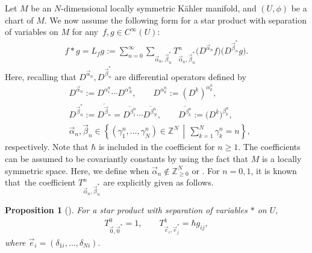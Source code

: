 \documentclass[pdftex]{sigma}
\numberwithin{equation}{section}
\newtheorem{Proposition}[Theorem]{Proposition}
 { \theoremstyle{definition}
\newtheorem{Definition}[Theorem]{Definition}
\newtheorem{Note}[Theorem]{Note}
\newtheorem{Example}[Theorem]{Example}
\newtheorem{Remark}[Theorem]{Remark} }
\begin{document}
Let $M$ be an $N$-dimensional locally symmetric K\"ahler manifold, and $(U,\phi)$ be a chart of $M$. We now assume the following form for a star product with separation of variables on $M$ for any~${ f,g \in C^{\infty} ( U )}$:
\begin{align}
 f\ast g
 =
 L_{f}g
 :=
 \sum_{n=0}^{\infty}
 \sum_{
 \vec{\alpha}_{n},
 \vec{\beta}_{n}^{\ast}
 }
 T_{\vec{\alpha}_{n},\vec{\beta}_{n}^{\ast}}^{n}
 \bigl(
 D^{\vec{\alpha}_{n}}f
 \bigr)
 \bigl(
 D^{\vec{\beta}_{n}^{\ast}}g
 \bigr).
 \label{star_expand}
\end{align}
Here, recalling that
$
 D^{\vec{\alpha}_{n}},
 D^{\vec{\beta}_{n}^{\ast}}
$
are differential operators defined by
\begin{align*}
 &
 D^{\vec{\alpha}_{n}}
 :=
 D^{\alpha_{1}^{n}}\cdots D^{\alpha_{N}^{n}},
 \qquad
 D^{\alpha_{k}^{n}}
 :=
 (
 D^{k}
 )^{\alpha_{k}^{n}},
 \\
 &
 D^{\vec{\beta}_{n}^{\ast}}
 :=
 \overline{
 D^{\vec{\beta}_{n}}
 }
 =
 \overline{D^{\beta_{1}^{n}}}
 \cdots
 \overline{D^{\beta_{N}^{n}}},
 \qquad
 \overline{D^{\beta_{k}^{n}}}
 :=
 \bigl(
 D^{\overline{k}}
 \bigr)^{\beta_{k}^{n}},
 \\
 &
 \vec{\alpha}_{n},
 \vec{\beta}_{n}
 \in
 \left\{
 (\gamma_{1}^{n},\dots,\gamma_{N}^{n} )
 \in
 \mathbb{Z}^{N}
 \,\middle|\,
 \sum_{k=1}^{N}
 \gamma_{k}^{n}
 =
 n
 \right\},
\end{align*}
respectively.
Note that $\hbar$ is included in the coefficient  for $n\geq1$. The coefficients
can be assumed to be covariantly constants by using the fact that $M$ is a locally symmetric space. Here, we define
when
$
 \vec{\alpha}_{n}
 \notin
 \mathbb{Z}_{\geq0}^{N}
$
or
.
For $n=0,1$, it is known that~the coefficient
$
 T_{\vec{\alpha}_{n},\vec{\beta}_{n}^{\ast}}^{n}
$
are explicitly given as follows.

\begin{Proposition}[\cite{HS1,HS2}]\label{prop:covar_const_0and1}
 For a star product with separation of variables $\ast$ on $U,$
 \begin{align}
 T_{\vec{0},\vec{0}^{\ast}}^{0}
 =
 1,
 \qquad
 T_{\vec{e}_{i},\vec{e}_{j}^{\ast}}^{1}
 =
 \hbar
 g_{i\overline{j}},
 \label{init_cond_01}
 \end{align}
 \noindent
 where
 $
 \vec{e}_{i}
 =
 (\delta_{1i},\dots,\delta_{Ni} ).
 $
\end{Proposition}
\end{document}
